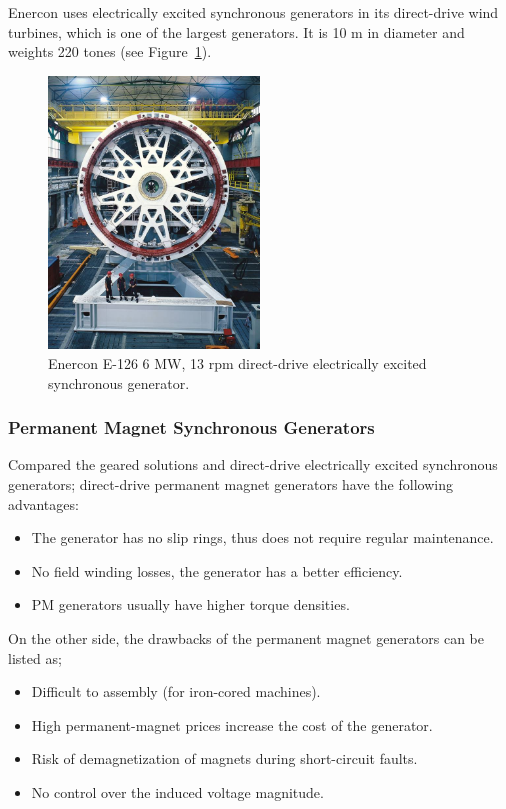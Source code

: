 \documentclass[a4paper, 11pt]{article} %
\begin{document}
Enercon uses electrically excited synchronous generators in its direct-drive wind turbines, which is one of the largest generators. It is 10 m in diameter and weights 220 tones (see Figure~\ref{enercon}). 

  \begin{figure}
    \centering
    \includegraphics[width=0.5\textwidth]{enercon}
    \caption{Enercon E-126 6 MW, 13 rpm direct-drive electrically excited synchronous generator.} 
    \label{enercon}
  \end{figure}


\subsubsection{Permanent Magnet Synchronous Generators}

Compared the geared solutions and direct-drive electrically excited synchronous generators; direct-drive permanent magnet generators have the following advantages:

\begin{itemize}
	\item The generator has no slip rings, thus does not require regular maintenance.
	\item No field winding losses, the generator has a better efficiency.
	\item PM generators usually have higher torque densities.
\end{itemize}

On the other side, the drawbacks of the permanent magnet generators can be listed as;

\begin{itemize}
	\item Difficult to assembly (for iron-cored machines).
	\item High permanent-magnet prices increase the cost of the generator.
	\item Risk of demagnetization of magnets during short-circuit faults.
	\item No control over the induced voltage magnitude.
\end{itemize}
\end{document}
